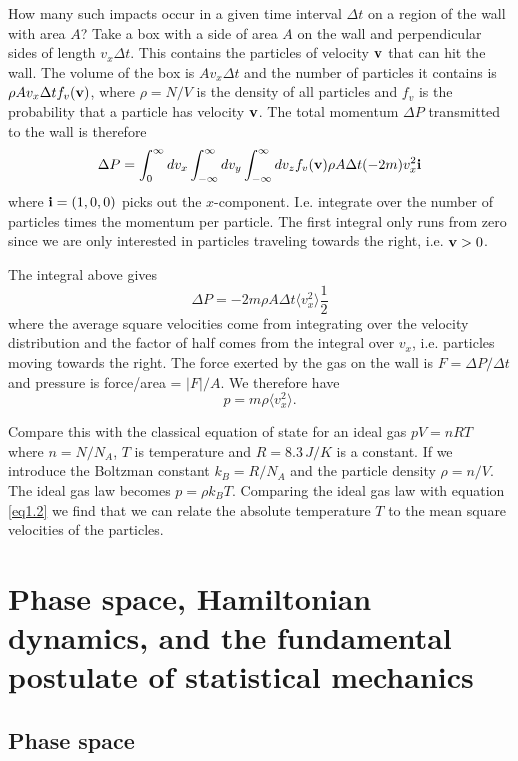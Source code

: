 \documentclass{article}
\begin{document}
How many such impacts occur in a given time interval $\Delta t$ on a region of the wall with area $A$? 
Take a box with a side of area $A$ on the wall and perpendicular sides of length $v_x\Delta t$. This contains the particles of velocity ${\bf v}$ that can hit the wall. The volume of the box is $Av_x\Delta t$ and the number of particles it contains is $\rho Av_x\Delta t f_v({\bf v})$, where $\rho=N/V$ is the density of all particles  and $f_v$ is the probability that a particle has velocity $\bf v$.
The total momentum $\Delta P$ transmitted to the wall is therefore
$$\Delta P =\int_0^\infty dv_x \int_{-\infty}^\infty dv_y \int_{-\infty}^\infty dv_z f_v({\bf v})\rho A\Delta t(-2m)v_x^2{\bf i}$$
where ${\bf i} =(1,0,0)$ picks out the $x$-component. I.e. integrate over the number of particles times the momentum per particle. The first integral only runs from zero since we are only interested in particles traveling towards the right, i.e. ${\bf v}>0$.

The integral above gives 
$$\Delta P = -2m\rho A\Delta t \langle v_x^2\rangle\frac12$$ where the average square velocities come from integrating over the velocity distribution and the factor of half comes from the integral over $v_x$, i.e. particles moving towards the right.
The force exerted by the gas on the wall is $F=\Delta P/\Delta t$ and pressure is force/area = $|F|/A$.
We therefore have 
\begin{equation}
	p=m\rho  \langle v_x^2\rangle.
	\label{eq1.2}
\end{equation}
 
Compare this with the classical equation of state for an ideal gas $pV=nRT$ where $n=N/N_A$, $T$ is temperature and $R=8.3 \, J/K$ is a constant. If we introduce the Boltzman constant $k_B = R/N_A$ and the particle density $\rho =n/V$. The ideal gas law becomes $p=\rho k_BT$. Comparing the ideal gas law with equation \ref{eq1.2} 
we find that we can relate the absolute temperature $T$ to the mean square velocities of the particles.

\section{Phase space, Hamiltonian dynamics, and the fundamental postulate of statistical mechanics}


\subsection{Phase space}
\end{document}
